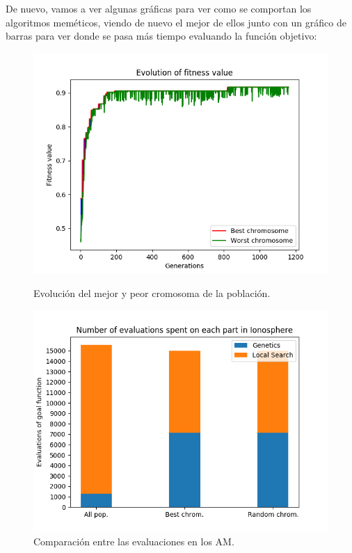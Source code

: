 \documentclass[11pt,a4paper]{article}
\begin{document}
De nuevo, vamos a ver algunas gráficas para ver como se comportan los algoritmos meméticos, viendo de nuevo el mejor de ellos
junto con un gráfico de barras para ver donde se pasa más tiempo evaluando la función objetivo:

\begin{figure}[H]
\centering
\begin{minipage}{.5\textwidth}
	\centering
	\includegraphics[scale=0.43]{img/am-best-ionosphere.png}
	\caption{Evolución del mejor y peor cromosoma de la población.}
\end{minipage}%
\begin{minipage}{.5\textwidth}
	\centering
	\includegraphics[scale=0.43]{img/bars-ionosphere.png}
	\caption{Comparación entre las evaluaciones en los AM.}
\end{minipage}
\end{figure}
\end{document}
